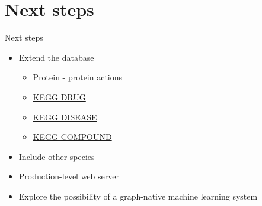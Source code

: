 \documentclass{beamer}
\begin{document}
\section{Next steps}
\begin{frame}{Next steps}
\begin{itemize}
    \item Extend the database
    \begin{itemize}
        \item Protein - protein actions
        \item \href{https://www.genome.jp/kegg/drug/}{KEGG DRUG}
        \item \href{https://www.genome.jp/kegg/disease/}{KEGG DISEASE}
        \item \href{https://www.genome.jp/kegg/compound/}{KEGG COMPOUND}
    \end{itemize}
    \vfill
    \item Include other species
    \vfill
    \item Production-level web server
    \vfill
    \item Explore the possibility of a graph-native machine learning system
\end{itemize}
\end{frame}
\end{document}

